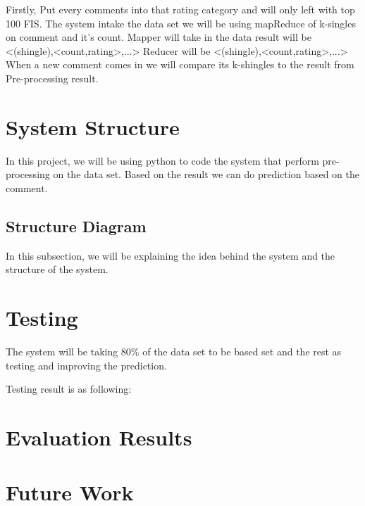 Firstly, Put every comments into that rating category and will only left with top 100 FIS. 
The system intake the data set we will be using mapReduce of k-singles on comment and it's count.
Mapper will take in the data result will be <(shingle),<count,rating>,...>
Reducer will be <(shingle),<count,rating>,...>
When a new comment comes in we will compare its k-shingles to the result from Pre-processing result.

\section{System Structure}
In this project, we will be using python to code the system that perform pre-processing on the data set. Based on the result we can do prediction based on the comment.
\subsection{Structure Diagram}
In this subsection, we will be explaining the idea behind the system and the structure of the system.


\section{Testing}
The system will be taking 80\% of the data set to be based set and the rest as testing and improving the prediction.

Testing result is as following:
\section{Evaluation Results}

\section{Future Work}
